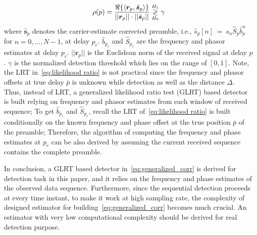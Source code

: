 \begin{equation}
    \label{eq:generalized_corr}
    \rho(p)=
    \frac{\Re\{\langle
      \bm{r}_{p},\hat{\bm{s}}_{p}\rangle\}}
    {||\bm{r}_{p}||\cdot||\hat{\bm{s}}_{p}||} \mathrel{\mathop\gtrless\limits^{H_1}_{H_0}} \gamma
  \end{equation}
where $\hat{\bm{s}}_{p}$ denotes the carrier-estimate corrected preamble, i.e., $\hat{s}_{p}[n]~{=}~s_{n}\hat{S}_{p}\hat{b}_{p}^n$ for $n=0,\ldots,N{-}1$,
at delay $p_c$. $\hat{b}_{p_c}$ and $\hat{S}_{p_c}$ are the frequency and phasor estimates at delay $p_c$.
$||\bm{r}_{p}||$ is the Euclidean norm of the received signal at delay $p$.
$\gamma$ is the normalized detection threshold which lies on the range of $[0,1]$.
Note, the LRT in~\eqref{eq:likelihood ratio} is not practical since the frequency and phasor offsets at true delay $\bar{p}$
is unknown while detection as well as the distance $\Delta$. 
Thus, instead of LRT, a generalized likelihood ratio test (GLRT) based detector is built relying on frequency and phasor estimates from each window of received sequence;
To get $\hat{b}_{p_c}$ and $\hat{S}_{p_c}$,
recall the LRT of~\eqref{eq:likelihood ratio} is built conditionally on the known frequency and phase offset 
at the true position $\bar{p}$ of the preamble; Therefore, the algorithm of computing the frequency and phase estimates at $p_c$ 
can be also derived by assuming the current received sequence contains the complete preamble.

In conclusion, a GLRT based detector in~\eqref{eq:generalized_corr} is derived for detection task in this paper, and it relies on the frequency and phase estimates of the observed data sequence.
Furthermore, since the sequential detection proceeds at every time instant, 
to make it work at high sampling rate, 
the complexity of designed estimator for building~\eqref{eq:generalized_corr} becomes
much crucial. An estimator with very low 
computational complexity should be derived for real detection purpose.








